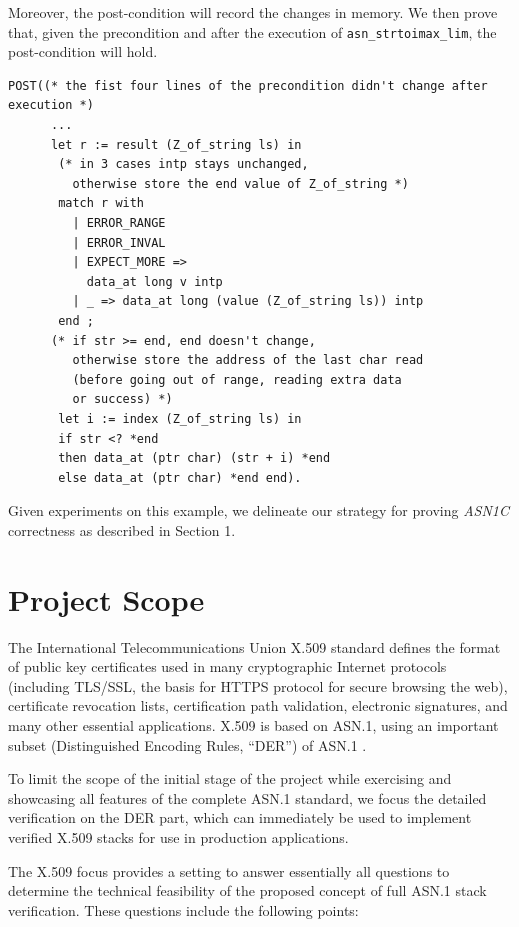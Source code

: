\documentclass[acmsmall,nonacm]{acmart}
\begin{document}
     Moreover, the post-condition will record the changes in memory. We then
     prove that, given the precondition and after the execution of
     \texttt{asn\_strtoimax\_lim}, the post-condition will hold.
           
\begin{lstlisting}[language=Coq]
 POST((* the fist four lines of the precondition didn't change after execution *)
      ... 
      let r := result (Z_of_string ls) in
       (* in 3 cases intp stays unchanged,
         otherwise store the end value of Z_of_string *)
       match r with 
         | ERROR_RANGE 
         | ERROR_INVAL 
         | EXPECT_MORE => 
           data_at long v intp
         | _ => data_at long (value (Z_of_string ls)) intp 
       end ;
      (* if str >= end, end doesn't change, 
         otherwise store the address of the last char read 
         (before going out of range, reading extra data 
         or success) *)
       let i := index (Z_of_string ls) in
       if str <? *end
       then data_at (ptr char) (str + i) *end
       else data_at (ptr char) *end end).
\end{lstlisting}

Given experiments on this example, we delineate our strategy for proving
\emph{ASN1C} correctness as described in Section 1.

\section{Project Scope}

The International Telecommunications Union X.509 standard
\cite{X509} defines the format of public key certificates used in
many cryptographic Internet protocols (including TLS/SSL, the basis
for HTTPS protocol for secure browsing the web), certificate
revocation lists, certification path validation, electronic
signatures, and many other essential applications. X.509 is based on
ASN.1, using an important subset (Distinguished
Encoding Rules, ``DER'') of ASN.1 \cite{BERandDER}.

To limit the scope of the initial stage of the project while
exercising and showcasing all features of the complete ASN.1
standard, we focus the detailed verification on the DER part,
which can immediately be used to implement verified X.509
stacks for use in production applications.
 
The X.509 focus provides a setting to answer essentially all questions
to determine the technical feasibility of the
proposed concept of full ASN.1 stack verification. These questions
include the following points:
\end{document}
